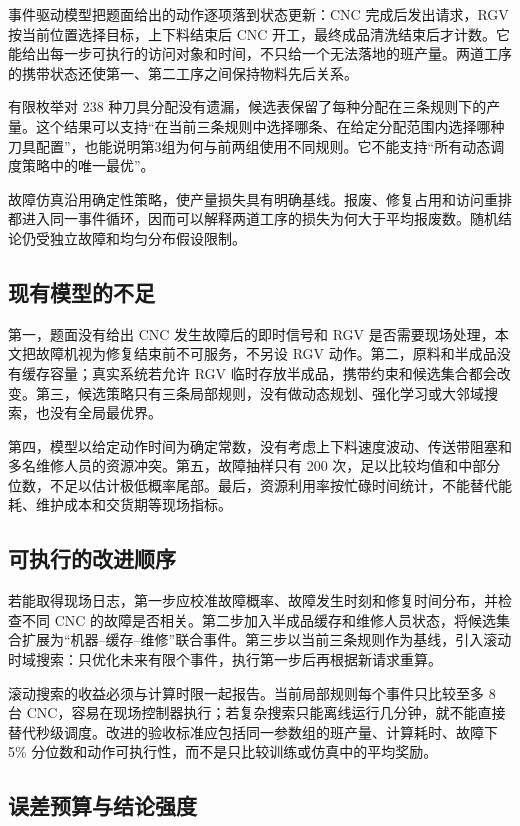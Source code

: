 \documentclass[UTF8,11pt,a4paper]{ctexart}
\begin{document}
事件驱动模型把题面给出的动作逐项落到状态更新：CNC 完成后发出请求，RGV 按当前位置选择目标，上下料结束后 CNC 开工，最终成品清洗结束后才计数。它能给出每一步可执行的访问对象和时间，不只给一个无法落地的班产量。两道工序的携带状态还使第一、第二工序之间保持物料先后关系。

有限枚举对 238 种刀具分配没有遗漏，候选表保留了每种分配在三条规则下的产量。这个结果可以支持“在当前三条规则中选择哪条、在给定分配范围内选择哪种刀具配置”，也能说明第3组为何与前两组使用不同规则。它不能支持“所有动态调度策略中的唯一最优”。

故障仿真沿用确定性策略，使产量损失具有明确基线。报废、修复占用和访问重排都进入同一事件循环，因而可以解释两道工序的损失为何大于平均报废数。随机结论仍受独立故障和均匀分布假设限制。

\subsection{现有模型的不足}

第一，题面没有给出 CNC 发生故障后的即时信号和 RGV 是否需要现场处理，本文把故障机视为修复结束前不可服务，不另设 RGV 动作。第二，原料和半成品没有缓存容量；真实系统若允许 RGV 临时存放半成品，携带约束和候选集合都会改变。第三，候选策略只有三条局部规则，没有做动态规划、强化学习或大邻域搜索，也没有全局最优界。

第四，模型以给定动作时间为确定常数，没有考虑上下料速度波动、传送带阻塞和多名维修人员的资源冲突。第五，故障抽样只有 200 次，足以比较均值和中部分位数，不足以估计极低概率尾部。最后，资源利用率按忙碌时间统计，不能替代能耗、维护成本和交货期等现场指标。

\subsection{可执行的改进顺序}

若能取得现场日志，第一步应校准故障概率、故障发生时刻和修复时间分布，并检查不同 CNC 的故障是否相关。第二步加入半成品缓存和维修人员状态，将候选集合扩展为“机器--缓存--维修”联合事件。第三步以当前三条规则作为基线，引入滚动时域搜索：只优化未来有限个事件，执行第一步后再根据新请求重算。

滚动搜索的收益必须与计算时限一起报告。当前局部规则每个事件只比较至多 8 台 CNC，容易在现场控制器执行；若复杂搜索只能离线运行几分钟，就不能直接替代秒级调度。改进的验收标准应包括同一参数组的班产量、计算耗时、故障下 5\% 分位数和动作可执行性，而不是只比较训练或仿真中的平均奖励。

\subsection{误差预算与结论强度}
\end{document}
